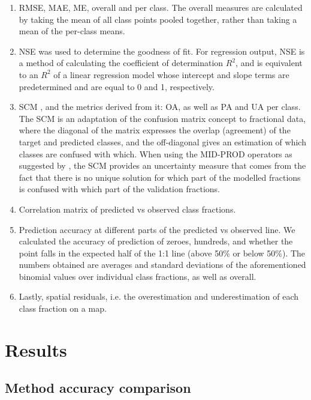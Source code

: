\documentclass[a4paper,10pt]{article}
\begin{document}
\begin{enumerate}
 \item \Gls{RMSE}, \ac{MAE}, \ac{ME}, overall and per class.
The overall measures are calculated by taking the mean of all class points pooled together, rather than taking a mean of the per-class means.
 \item \Gls{NSE} was used to determine the goodness of fit.
For regression output, \ac{NSE} is a method of calculating the coefficient of determination $R^2$, and is equivalent to an $R^2$ of a linear regression model whose intercept and slope terms are predetermined and are equal to 0 and 1, respectively.
 \item \Gls{SCM} \citep{silvan-cardenas_sub-pixel_2008}, and the metrics derived from it: \ac{OA}, as well as \ac{PA} and \ac{UA} per class.
The \gls{SCM} is an adaptation of the confusion matrix concept to fractional data, where the diagonal of the matrix expresses the overlap (agreement) of the target and predicted classes, and the off-diagonal gives an estimation of which classes are confused with which.
When using the MID-PROD operators as suggested by \citet{silvan-cardenas_sub-pixel_2008}, the \ac{SCM} provides an uncertainty measure that comes from the fact that there is no unique solution for which part of the modelled fractions is confused with which part of the validation fractions.
 \item Correlation matrix of predicted vs observed class fractions.
 \item Prediction accuracy at different parts of the predicted vs observed line.
We calculated the accuracy of prediction of zeroes, hundreds, and whether the point falls in the expected half of the 1:1 line (above 50\% or below 50\%).
The numbers obtained are averages and standard deviations of the aforementioned binomial values over individual class fractions, as well as overall.
\item Lastly, spatial residuals, i.e. the overestimation and underestimation of each class fraction on a map.
\end{enumerate}

\section{Results}

\subsection{Method accuracy comparison}
\end{document}
